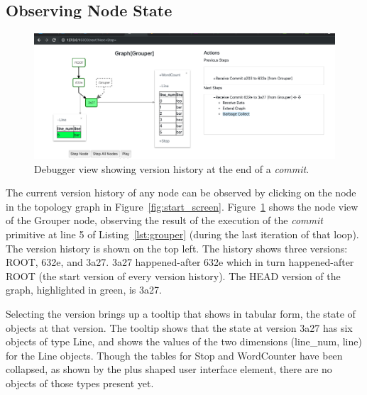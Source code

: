 \subsection{Observing Node State}

\begin{figure}
\centering
\includegraphics[width=\textwidth]{images/grouper_after_commit.png}
\caption{Debugger view showing version history at the end of a {\em commit}.}
\label{fig:after_commit}
\end{figure}

The current version history of any node can be observed by clicking on the node in the topology graph in Figure~\ref{fig:start_screen}. Figure~\ref{fig:after_commit} shows the node view of the Grouper node, observing the result of the execution of the {\em commit} primitive at line 5 of Listing~\ref{lst:grouper} (during the last iteration of that loop). The version history is shown on the top left. The history shows three versions: ROOT, 632e, and 3a27. 3a27 happened-after 632e which in turn happened-after ROOT (the start version of every version history). The HEAD version of the graph, highlighted in green, is 3a27. 

Selecting the version brings up a tooltip that shows in tabular form, the state of objects at that version. The tooltip shows that the state at version 3a27 has six objects of type Line, and shows the values of the two dimensions (line\_num, line) for the Line objects. Though the tables for Stop and WordCounter have been collapsed, as shown by the plus shaped user interface element, there are no objects of those types present yet.

